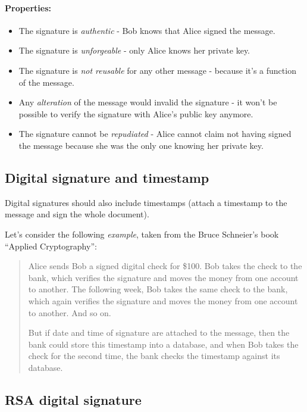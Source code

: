 \documentclass{article}
\begin{document}
	\paragraph{Properties:}

	\begin{itemize}
		\item The signature is \emph{authentic} - Bob knows that Alice signed the
			message.
		\item The signature is \emph{unforgeable} - only Alice knows her private
			key.
		\item The signature is \emph{not reusable} for any other message -
			because it's a function of the message.
		\item Any \emph{alteration} of the message would invalid the signature -
			it won't be possible to verify the signature with Alice's public key anymore.
		\item The signature cannot be \emph{repudiated} - Alice cannot claim not
			having signed the message because she was the only one knowing her
			private key.
	\end{itemize}

	\subsection{Digital signature and timestamp}

	Digital signatures should also include timestamps (attach a timestamp to the
	message and sign the whole document). 

	Let's consider the following \emph{example}, taken from the Bruce Schneier's book
	“Applied Cryptography”:
	\begin{quotation}
		Alice sends Bob a signed digital check for \$100. Bob takes the check to
		the bank, which verifies the signature and moves the money from one
		account to another.
		The following week, Bob takes the same check to the bank, which again
		verifies the signature and moves the money from one account to another.
		And so on.

		But if date and time of signature are attached to the message, then the bank
		could store this timestamp into a database, and when Bob takes the check for
		the second time, the bank checks the timestamp against its database.
	\end{quotation}

	\subsection{RSA digital signature}
\end{document}
